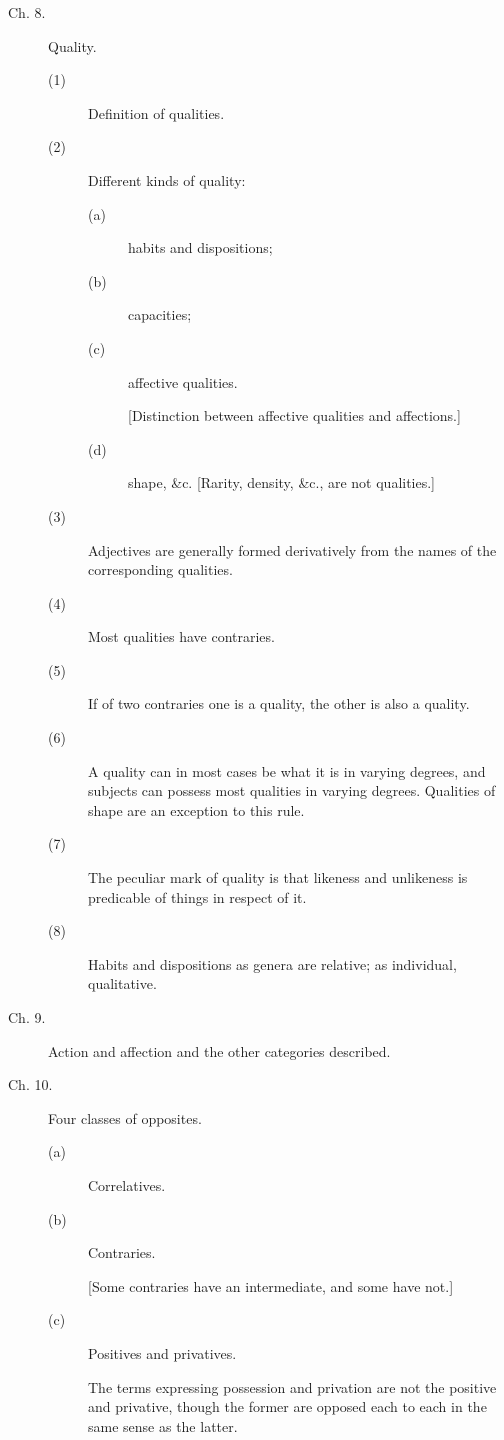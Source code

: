 \begin{description}
\item[Ch. 8.] Quality.
\begin{description}
\item[(1)] Definition of qualities. 
\item[(2)] Different kinds of quality:
\begin{description}
\item[(a)] habits and dispositions; 
\item[(b)] capacities;
\item[(c)] affective qualities.

[Distinction between affective qualities and affections.] 
\item[(d)] shape, {\&}c. [Rarity, density, {\&}c., are not qualities.]
\end{description}
\item[(3)] Adjectives are generally formed derivatively from the names of the corresponding qualities. 
\item[(4)] Most qualities have contraries. 
\item[(5)] If of two contraries one is a quality, the other is also a quality. 
\item[(6)] A quality can in most cases be what it is in varying degrees, and subjects can possess most qualities in varying degrees.
Qualities of shape are an exception to this rule. 
\item[(7)] The peculiar mark of quality is that likeness and unlikeness is 
predicable of things in respect of it. 
\item[(8)] Habits and dispositions as genera are relative; as individual, qualitative. 
\end{description}

\item[Ch. 9.] Action and affection and the other categories described. 

\item[Ch. 10.] Four classes of opposites.
\begin{description}
\item[(a)] Correlatives. 
\item[(b)] Contraries.

[Some contraries have an intermediate, and some have not.] 
\item[(c)] Positives and privatives. 

The terms expressing possession and privation are not the positive 
and privative, though the former are opposed each to each in the same 
sense as the latter. 


\end{description}
\end{description}
